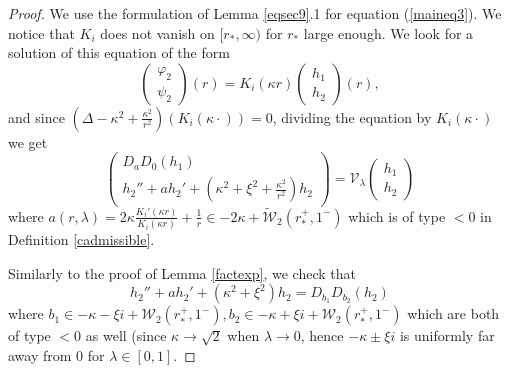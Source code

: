 \documentclass[11 pt]{amsart}
\theoremstyle{definition}
\theoremstyle{remark}
\numberwithin{equation}{section}
\begin{document}
\begin{proof}
  We use the formulation of Lemma \ref{eqsec9}.1 for equation (\ref{maineq3}). We notice that $K_i$ does not vanish on $[r_*,\infty)$ for $r_*$ large enough. 
  We look for a solution of this equation of the form
  \[ \left(\begin{array}{c}
       \varphi_2\\
       \psi_2
     \end{array}\right) (r) = K_i (\kappa r) \left(\begin{array}{c}
       h_1\\
       h_2
     \end{array}\right) (r), \]
  and since $\left( \Delta - \kappa^2 + \frac{\kappa^2}{r^2} \right) (K_i
  (\kappa \cdot)) = 0$, dividing the equation by $K_i (\kappa \cdot)$ we get
  \[ \left(\begin{array}{c}
       D_a D_0 (h_1)\\
       h_2'' + a h_2' + (\kappa^2 + \xi^2+\frac{\kappa^2}{r^2}) h_2
     \end{array}\right) =\mathcal{V}_{\lambda} \left(\begin{array}{c}
       h_1\\
       h_2
     \end{array}\right) \]
  where $a (r, \lambda) = 2 \kappa \frac{K_i' (\kappa r)}{K_i (\kappa r)} +
  \frac{1}{r} \in - 2 \kappa + \widetilde{\mathcal{W}}_2 (r_\ast^+, 1^-)$ which is of
  type $< 0$ in Definition \ref{cadmissible}. 
  
  Similarly to the proof of Lemma \ref{factexp}, we check that
  \[ h_2'' + a h_2' + (\kappa^2 + \xi^2) h_2 = D_{b_1} D_{b_2} (h_2) \]
  where $b_1 \in - \kappa - \xi i +\mathcal{W}_2 (r_\ast^+, 1^-), b_2 \in - \kappa
  + \xi i +\mathcal{W}_2 (r_\ast^+, 1^-)$ which are both of type $< 0$ as well
  (since $\kappa \rightarrow \sqrt{2}$ when $\lambda \rightarrow 0$, hence $-
  \kappa \pm \xi i$ is uniformly far away from $0$ for $\lambda \in [0, 1]$.
  

\end{proof}
\end{document}
